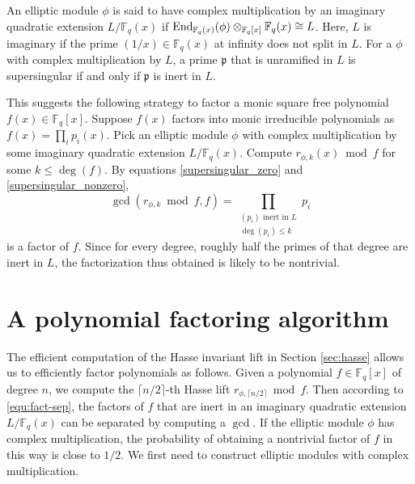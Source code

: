 \documentclass[12pt]{article}
\theoremstyle{plain}
\theoremstyle{definition}
\DeclareMathOperator{\End}{{\rm End}} %
\def\F{\ensuremath{\mathbb{F}}}
\newcommand{\p}{\mathfrak p}
\begin{document}
An elliptic module $\phi$ is said to have complex multiplication by an imaginary quadratic 
extension $L/\F_q(x)$ if $\End_{\F_q(x)}(\phi)\otimes_{\F_q[x]} \F_q(x) \cong L$. Here, $L$ is 
imaginary if the prime $(1/x) \in \F_q(x)$ at infinity does not split in $L$. For a $\phi$ with 
complex multiplication by $L$, a prime $\p$ that is unramified in $L$ is supersingular if and
only if $\p$ is inert in $L$.

This suggests the following strategy to factor a monic square free polynomial $f(x) \in \F_q[x]$. 
Suppose $f(x)$ factors into monic irreducible polynomials as $f(x) = \prod_i p_i(x)$. Pick an 
elliptic module $\phi$ with complex multiplication by some imaginary quadratic extension 
$L/\F_q(x)$. Compute $r_{\phi,k}(x) \bmod f$ for some $k \le \deg(f)$. By equations 
\eqref{supersingular_zero} and \eqref{supersingular_nonzero}, 
\begin{equation}
\label{equ:fact-sep}
	\gcd(r_{\phi,k} \bmod f, f) = \prod_{\substack{(p_i) \text{ inert in } L \\ \deg(p_i) \le k}} 
	p_i
\end{equation}
is a factor of $f$. Since for every degree, roughly half the primes of that degree are inert in 
$L$, the factorization thus obtained is likely to be nontrivial.




\section{A polynomial factoring algorithm}
\label{sec:poly-fac}

The efficient computation of the Hasse invariant lift in Section \ref{sec:hasse} allows us to 
efficiently factor polynomials as follows. Given a polynomial $f \in \F_q[x]$ of degree $n$, we 
compute the $\lceil n / 2 \rceil$-th Hasse lift $r_{\phi, \lceil n / 2 \rceil} \bmod f$. Then 
according to \eqref{equ:fact-sep}, the factors of $f$ that are inert in an imaginary quadratic 
extension $L/\F_q(x)$ can be separated by computing a $\gcd$. If the elliptic module $\phi$ has 
complex multiplication, the probability of obtaining a nontrivial factor of $f$ in this way is 
close to $1/2$. We first need to construct elliptic modules with complex multiplication.
\end{document}

